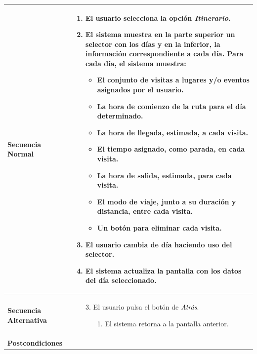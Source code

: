 \begin{longtable}{| p{4cm} | p{10cm} |}
\hline
\textbf{Secuencia Normal} &\mbox{}\par\vspace{-\baselineskip}
\begin{enumerate}[leftmargin=0.7cm, topsep=0.1cm]
\item El usuario selecciona la opción \textit{Itinerario}.
\item El sistema muestra en la parte superior un selector con los días y en la inferior, la información correspondiente a cada día. Para cada día, el sistema muestra:
	\begin{itemize}
	\item El conjunto de visitas a lugares y/o eventos asignados por el usuario.
	\item La hora de comienzo de la ruta para el día determinado.
	\item La hora de llegada, estimada, a cada visita.
	\item El tiempo asignado, como parada, en cada visita.
	\item La hora de salida, estimada, para cada visita.
	\item El modo de viaje, junto a su duración y distancia, entre cada visita.
	\item Un botón para eliminar cada visita.
	\end{itemize}
\item El usuario cambia de día haciendo uso del selector.
\item El sistema actualiza la pantalla con los datos del día seleccionado.
\end{enumerate}


\\
\hline
\textbf{Secuencia Alternativa} &\mbox{}\par\vspace{-\baselineskip}
\begin{enumerate}[leftmargin=0.9cm, topsep=0.1cm]
\item[3.] El usuario pulsa el botón de \textit{Atrás}.
	\begin{itemize}
	\item[1.] El sistema retorna a la pantalla anterior.
	\end{itemize}
\end{enumerate}
\\

\hline
\textbf{Postcondiciones} & \\
\hline
\end{longtable}



